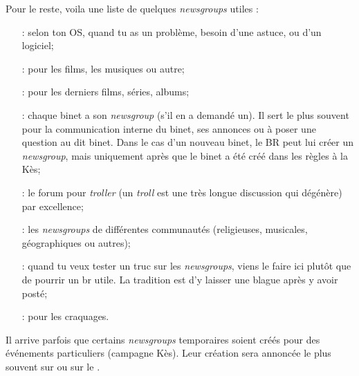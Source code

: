 Pour le reste, voila une liste de quelques \emph{newsgroups} utiles :
\begin{itemize}

\item[\ngname{br.informatique.windows/linux/mac} :] selon ton OS, quand tu as un problème, besoin d'une astuce, ou d'un logiciel;

\item[\ngname{br.informatique.media.request.*} :] pour les films, les musiques ou autre;

\item[\ngname{br.informatique.media.nouveautes} :] pour les derniers films, séries, albums;

\item[\ngname{br.binet.ton\_binet} :] chaque binet a son \emph{newsgroup} (s'il en a demandé un). Il sert le plus souvent pour la communication interne du binet, ses annonces ou à poser une question au dit binet. Dans le cas d'un nouveau binet, le BR peut lui créer un \emph{newsgroup}, mais uniquement après que le binet a été créé dans les règles à la Kès;

\item[\ngname{br.binet.polemix} :] le forum pour \emph{troller} (un \emph{troll} est une très longue discussion qui dégénère) par excellence;
                          
\item[\ngname{br.communauté.*} :] les \emph{newsgroups} de différentes communautés (religieuses, musicales, géographiques ou autres);

\item[\ngname{br.test} :] quand tu veux tester un truc sur les \emph{newsgroups}, viens le faire ici plutôt que de pourrir un br utile. La tradition est d'y laisser une blague après y avoir posté;

 \item[\ngname{br.trash} :] pour les craquages.

\end{itemize}


Il arrive parfois que certains \emph{newsgroups} temporaires soient créés pour des événements particuliers (campagne Kès). Leur création sera annoncée
le plus souvent sur \fkz ou sur le .

